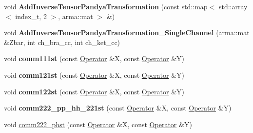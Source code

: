 \begin{DoxyCompactItemize}
\item 
\mbox{\label{classOperator_aba076be3627e655728ee3809ce76206a}} 
void {\bfseries Add\+Inverse\+Tensor\+Pandya\+Transformation} (const std\+::map$<$ std\+::array$<$ index\+\_\+t, 2 $>$, arma\+::mat $>$ \&)
\item 
\mbox{\label{classOperator_a5d90f7e7e9e9bcfe814465ee7a271b60}} 
void {\bfseries Add\+Inverse\+Tensor\+Pandya\+Transformation\+\_\+\+Single\+Channel} (arma\+::mat \&Zbar, int ch\+\_\+bra\+\_\+cc, int ch\+\_\+ket\+\_\+cc)
\item 
\mbox{\label{classOperator_a9e365e6c594c517083fe6af1eb5907b2}} 
void {\bfseries comm111st} (const \hyperlink{classOperator}{Operator} \&X, const \hyperlink{classOperator}{Operator} \&Y)
\item 
\mbox{\label{classOperator_aa2d57c0b2c5564d60e478eb10649ac3a}} 
void {\bfseries comm121st} (const \hyperlink{classOperator}{Operator} \&X, const \hyperlink{classOperator}{Operator} \&Y)
\item 
\mbox{\label{classOperator_abc49b2355a2b45a6636fc99899a70616}} 
void {\bfseries comm122st} (const \hyperlink{classOperator}{Operator} \&X, const \hyperlink{classOperator}{Operator} \&Y)
\item 
\mbox{\label{classOperator_a18deafc783e666ae2f9021a2a5dec2cb}} 
void {\bfseries comm222\+\_\+pp\+\_\+hh\+\_\+221st} (const \hyperlink{classOperator}{Operator} \&X, const \hyperlink{classOperator}{Operator} \&Y)
\item 
void \hyperlink{classOperator_a85ffd47b8d0db4cdbb6ef4684adbedeb}{comm222\+\_\+phst} (const \hyperlink{classOperator}{Operator} \&X, const \hyperlink{classOperator}{Operator} \&Y)
\end{DoxyCompactItemize}
